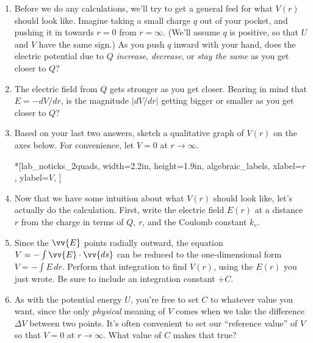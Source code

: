\begin{enumerate}[labparts]

\item Before we do any calculations, we'll try to get a general feel for what $V(r)$ should look like.  Imagine taking a small charge $q$ out of your pocket, and pushing it in towards $r=0$ from $r=\infty$.  (We'll assume $q$ is positive, so that $U$ and $V$ have the same sign.)  As you push $q$ inward with your hand, does the electric potential due to $Q$ \textit{increase}, \textit{decrease}, or \textit{stay the same} as you get closer to $Q$?
\answerspace{0.4in}

\item The electric field from $Q$ gets stronger as you get closer.  Bearing in mind that $E = -dV/dr$, is the magnitude $\left | {dV}/{dr}\right |$ getting bigger or smaller as you get closer to $Q$?
\answerspace{0.4in}

\item Based on your last two answers, sketch a qualitative graph of $V(r)$ on the axes below.  For convenience, let $V=0$ at $r \rightarrow \infty$. \label{part_potential_intro_sketch_of_Vr}
\begin{lab_axis}*[lab_noticks_2quads,
	width={2.2in}, height={1.9in},
	algebraic_labels,
	xlabel={$r$},
	ylabel={$V$},
	]
\end{lab_axis}

\pagebreak[2]
\item Now that we have some intuition about what $V(r)$ should look like, let's actually do the calculation.  First, write the electric field $E(r)$ at a distance $r$ from the charge in terms of $Q$, $r$, and the Coulomb constant $k_e$.
\answerspace{0.5in}

\item Since the $\vv{E}$ points radially outward, the equation $V=-\int{\vv{E} \cdot \vv{ds}}$ can be reduced to 
the one-dimensional form $V=-\int{E \, dr}$.  Perform that integration to find $V(r)$, using the $E(r)$ you just wrote. Be sure to include an integration constant $+C$.
\answerspace{1.2in}

\item As with the potential energy $U$, you're free to set $C$ to whatever value you want, since the only \textit{physical} meaning of $V$ comes when we take the difference $\Delta V$ between two points.  It's often convenient to set our ``reference value'' of $V$ so that $V=0$ at $r \rightarrow \infty$.  What value of $C$ makes that true?
\answerspace{0.5in}


\end{enumerate}

